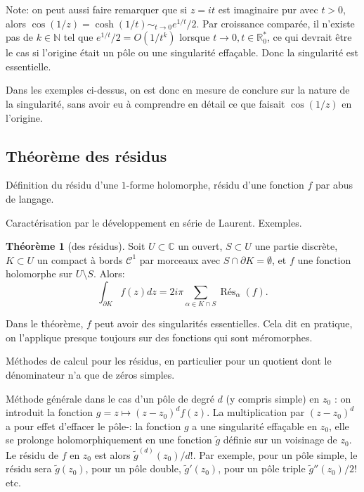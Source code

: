\documentclass[11pt,a4paper]{article}
\newcommand{\N}{\mathbb{N}}
\newcommand{\R}{\mathbb{R}}
\newcommand{\C}{\mathbb{C}}
\theoremstyle{definition}
\newtheorem{theoreme}{Th\'eor\`eme}[section]
\theoremstyle{plain}
\begin{document}
Note: on peut aussi faire remarquer que si $z=it$ est imaginaire pur avec $t>0$, alors $\cos(1/z) = \cosh(1/t)\sim_{t\to 0} e^{1/t}/2$. Par croissance comparée,  il n'existe pas de $k\in\N$ tel que $e^{1/t}/2 = O(1/t^k)$ lorsque $t\to 0, t\in\R_0^*$, ce qui devrait être le cas si l'origine était un pôle ou une singularité effaçable. Donc la singularité est essentielle.

Dans les exemples ci-dessus, on est donc en mesure de conclure sur la nature de la singularité, sans avoir eu à comprendre en détail ce que faisait $\cos(1/z)$ en l'origine.

\subsection{Théorème des résidus}

Définition du résidu d'une $1$-forme holomorphe, résidu d'une fonction $f$  par abus de langage.

Caractérisation par le développement en série de Laurent. Exemples.


\begin{theoreme}[des résidus]
Soit $U\subset \C$ un ouvert, $S\subset U$ une partie discrète, $K\subset U$ un compact à bords $\mathcal C^1$ par morceaux avec $S\cap \partial K = \emptyset$, et $f$ une fonction holomorphe sur $U\setminus S$.
Alors:
\[ \int_{\partial K} f(z)dz = 2i\pi \sum_{\alpha \in K\cap S} \operatorname{Rés}_\alpha(f).\]
\end{theoreme}

\begin{remarque}
Dans le théorème, $f$ peut avoir des singularités essentielles.
Cela dit en pratique, on l'applique presque toujours sur des fonctions qui sont méromorphes.
\end{remarque}

Méthodes de calcul pour les résidus, en particulier pour un quotient dont le dénominateur n'a que de zéros simples.

Méthode générale dans le cas d'un pôle de degré $d$ (y compris simple) en $z_0$ : on introduit la fonction $g = z\mapsto (z-z_0)^df(z)$. La multiplication par $(z-z_0)^d$ a pour effet \og d'effacer le pôle-\fg : la fonction $g$ a une singularité effaçable en $z_0$, elle se prolonge holomorphiquement en une fonction $\tilde g$ définie sur un voisinage de $z_0$. Le résidu de $f$ en $z_0$ est alors $\tilde g^{(d)}(z_0)/d!$. Par exemple, pour un pôle simple, le résidu sera $\tilde g(z_0)$, pour un pôle double, $\tilde g'(z_0)$, pour un pôle triple $\tilde g''(z_0)/2!$ etc.
\end{document}
